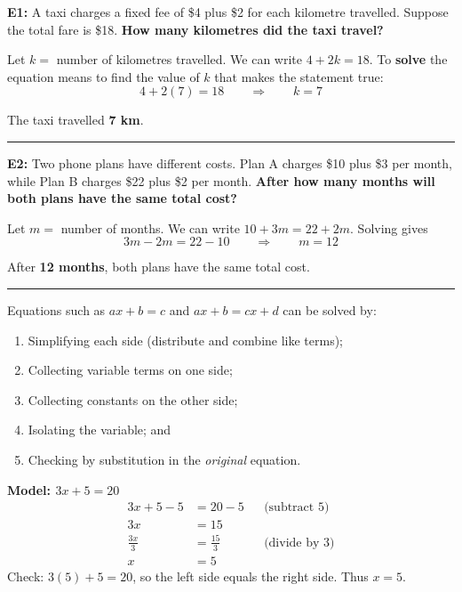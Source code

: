 	\begin{multicols}{2}
		
		
		\textbf{E1:} A taxi charges a fixed fee of \$4 plus \$2 for each kilometre travelled.
		Suppose the total fare is \$18. \textbf{How many kilometres did the taxi travel?}
		
		Let $k =$ number of kilometres travelled. We can write $4+2k=18$.
		To \textbf{solve} the equation means to find the value of $k$ that makes the
		statement true: 
		\vspace{-2mm}
		\[
		4+2(7)=18 \qquad\Rightarrow\qquad k=7
		\] 
		
		\vspace{-2mm}
		The taxi travelled \textbf{7 km}.
		\vspace{-4mm}
		
		\noindent\rule{\linewidth}{0.4pt}
		
		\smallskip
		
		\textbf{E2:} Two phone plans have different costs. Plan A charges \$10 plus \$3 per month,
		while Plan B charges \$22 plus \$2 per month. \textbf{After how many months will
		both plans have the same total cost?}
		
		Let $m =$ number of months. We can write $10+3m=22+2m$. Solving gives \vspace{-2mm}
		\[
		3m-2m=22-10 \qquad\Rightarrow\qquad m=12
		\]
		
		\vspace{-3mm}
		After \textbf{12 months}, both plans have the same total cost.
		\vspace{-4mm}
		
		\noindent\rule{\linewidth}{0.4pt}
		
		Equations such as $ax+b=c$ and $ax+b=cx+d$ can be solved by:
		\begin{enumerate}
			\item Simplifying each side (distribute and combine like terms);
			\item Collecting variable terms on one side;
			\item Collecting constants on the other side;
			\item Isolating the variable; and
			\item Checking by substitution in the \emph{original} equation.
		\end{enumerate}
		
		\textbf{Model: \quad $3x+5=20$}
		\vspace{-2mm}
		\begin{align*}
			3x+5-5&=20-5 &&\text{(subtract 5)}\\
			3x&=15\\
			\frac{3x}{3}&=\frac{15}{3} &&\text{(divide by 3)}\\
			x&=5
		\end{align*}
		Check: $3(5)+5=20$, so the left side equals the right side. Thus $x=5$.
		

\end{multicols}

